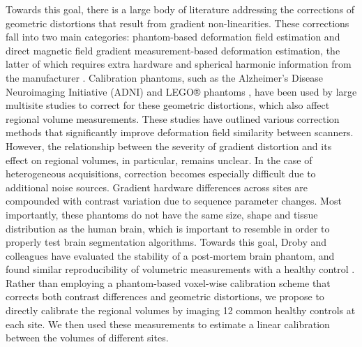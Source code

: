 Towards this goal, there is a large body of literature addressing the corrections of geometric distortions that result from gradient non-linearities. These corrections fall into two main categories: phantom-based deformation field estimation and direct magnetic field gradient measurement-based deformation estimation, the latter of which requires extra hardware and spherical harmonic information from the manufacturer \cite{fonov2010improved}. Calibration phantoms, such as the Alzheimer's Disease Neuroimaging Initiative (ADNI) \cite{gunter2009measurement} and LEGO® phantoms \cite{caramanos2010gradient}, have been used by large multisite studies to correct for these geometric distortions, which also affect regional volume measurements. These studies have outlined various correction methods that significantly improve deformation field similarity between scanners. However, the relationship between the severity of gradient distortion and its effect on regional volumes, in particular, remains unclear. In the case of heterogeneous acquisitions, correction becomes especially difficult due to additional noise sources. Gradient hardware differences across sites are compounded with contrast variation due to sequence parameter changes. Most importantly, these phantoms do not have the same size, shape and tissue distribution as the human brain, which is important to resemble in order to properly test brain segmentation algorithms. Towards this goal, Droby and colleagues have evaluated the stability of a post-mortem brain phantom, and found similar reproducibility of volumetric measurements with a healthy control \cite{droby2015human}. Rather than employing a phantom-based voxel-wise calibration scheme that corrects both contrast differences and geometric distortions, we propose to directly calibrate the regional volumes by imaging 12 common healthy controls at each site. We then used these measurements to estimate a linear calibration between the volumes of different sites.